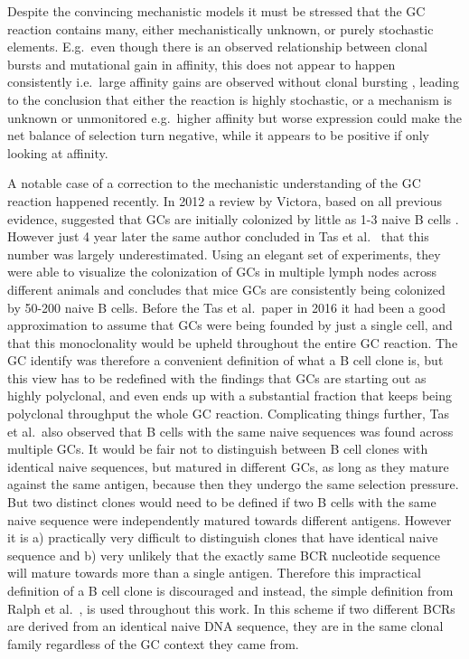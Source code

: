 Despite the convincing mechanistic models it must be stressed that the GC reaction contains many, either mechanistically unknown, or purely stochastic elements.
E.g.\ even though there is an observed relationship between clonal bursts and mutational gain in affinity, this does not appear to happen consistently i.e.\ large affinity gains are observed without clonal bursting \cite{tas2016visualizing}, leading to the conclusion that either the reaction is highly stochastic, or a mechanism is unknown or unmonitored e.g.\ higher affinity but worse expression could make the net balance of selection turn negative, while it appears to be positive if only looking at affinity.

A notable case of a correction to the mechanistic understanding of the GC reaction happened recently.
In 2012 a review by Victora, based on all previous evidence, suggested that GCs are initially colonized by little as 1-3 naive B cells \cite{victora2012germinal}.
However just 4 year later the same author concluded in Tas et al.\ \cite{tas2016visualizing} that this number was largely underestimated.
Using an elegant set of experiments, they were able to visualize the colonization of GCs in multiple lymph nodes across different animals and concludes that mice GCs are consistently being colonized by 50-200 naive B cells.
Before the Tas et al.\ paper in 2016 it had been a good approximation to assume that GCs were being founded by just a single cell, and that this monoclonality would be upheld throughout the entire GC reaction.
The GC identify was therefore a convenient definition of what a B cell clone is, but this view has to be redefined with the findings that GCs are starting out as highly polyclonal, and even ends up with a substantial fraction that keeps being polyclonal throughput the whole GC reaction.
Complicating things further, Tas et al.\ also observed that B cells with the same naive sequences was found across multiple GCs.
It would be fair not to distinguish between B cell clones with identical naive sequences, but matured in different GCs, as long as they mature against the same antigen, because then they undergo the same selection pressure.
But two distinct clones would need to be defined if two B cells with the same naive sequence were independently matured towards different antigens.
However it is a) practically very difficult to distinguish clones that have identical naive sequence and b) very unlikely that the exactly same BCR nucleotide sequence will mature towards more than a single antigen.
Therefore this impractical definition of a B cell clone is discouraged and instead, the simple definition from Ralph et al.\ \cite{ralph2016likelihood}, is used throughout this work.
In this scheme if two different BCRs are derived from an identical naive DNA sequence, they are in the same clonal family regardless of the GC context they came from.




